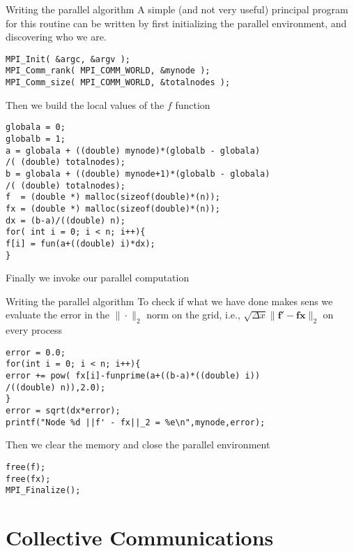 \documentclass[xcolor={svgnames,usenames}]{beamer}
\begin{document}
\begin{frame}[fragile]{Writing the parallel algorithm}
\footnotesize
A simple (and not very useful) principal program for this routine can be written by first initializing the parallel environment, and discovering who we are.
\begin{verbatim}
MPI_Init( &argc, &argv );
MPI_Comm_rank( MPI_COMM_WORLD, &mynode );
MPI_Comm_size( MPI_COMM_WORLD, &totalnodes );
\end{verbatim}
Then we build the local values of the $f$ function
\begin{verbatim}
globala = 0;
globalb = 1;
a = globala + ((double) mynode)*(globalb - globala)
/( (double) totalnodes);
b = globala + ((double) mynode+1)*(globalb - globala)
/( (double) totalnodes);
f  = (double *) malloc(sizeof(double)*(n));
fx = (double *) malloc(sizeof(double)*(n));
dx = (b-a)/((double) n);
for( int i = 0; i < n; i++){
f[i] = fun(a+((double) i)*dx);
}
\end{verbatim}
Finally we invoke our parallel computation
\end{frame}

\begin{frame}[fragile]{Writing the parallel algorithm}
To check if what we have done makes sens we evaluate the error in the $\|\cdot\|_2$ norm on the grid, i.e., $\sqrt{\Delta x} \| \mathbf{f}' - \mathbf{fx}\|_2$ on every process
\begin{verbatim}
error = 0.0;
for(int i = 0; i < n; i++){
error += pow( fx[i]-funprime(a+((b-a)*((double) i))
/((double) n)),2.0);
}
error = sqrt(dx*error);
printf("Node %d ||f' - fx||_2 = %e\n",mynode,error);
\end{verbatim}
Then we clear the memory and close the parallel environment
\begin{verbatim}
free(f);
free(fx);
MPI_Finalize();
\end{verbatim}
\end{frame}

\section{Collective Communications}
\end{document}
